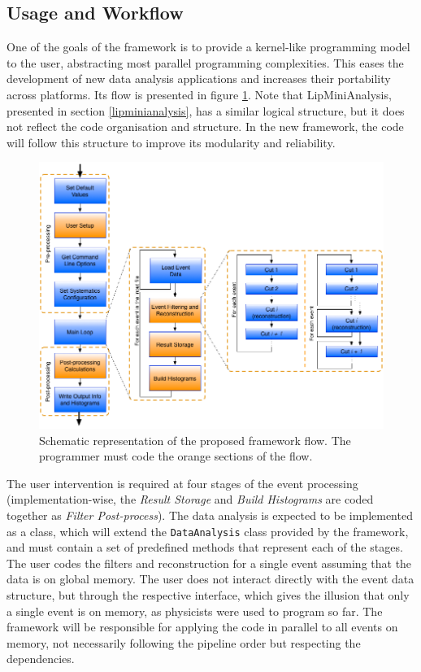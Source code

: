 \subsection{Usage and Workflow}
\label{usage_workflow}

One of the goals of the framework is to provide a kernel-like programming model to the user, abstracting most parallel programming complexities. This eases the development of new data analysis applications and increases their portability across platforms. Its flow is presented in figure \ref{fig:new_framework_flow}. Note that LipMiniAnalysis, presented in section \ref{lipminianalysis}, has a similar logical structure, but it does not reflect the code organisation and structure. In the new framework, the code will follow this structure to improve its modularity and reliability.

\begin{figure}[!htp]
	\begin{center}
		\includegraphics[scale=0.5]{imgs/new_framework_flow.png}
		\caption{Schematic representation of the proposed framework flow. The programmer must code the orange sections of the flow.}
		\label{fig:new_framework_flow}
	\end{center}
\end{figure}

The user intervention is required at four stages of the event processing (implementation-wise, the \textit{Result Storage} and \textit{Build Histograms} are coded together as \textit{Filter Post-process}). The data analysis is expected to be implemented as a class, which will extend the \texttt{DataAnalysis} class provided by the framework, and must contain a set of predefined methods that represent each of the stages. The user codes the filters and reconstruction for a single event assuming that the data is on global memory. The user does not interact directly with the event data structure, but through the respective interface, which gives the illusion that only a single event is on memory, as physicists were used to program so far. The framework will be responsible for applying the code in parallel to all events on memory, not necessarily following the pipeline order but respecting the dependencies.

